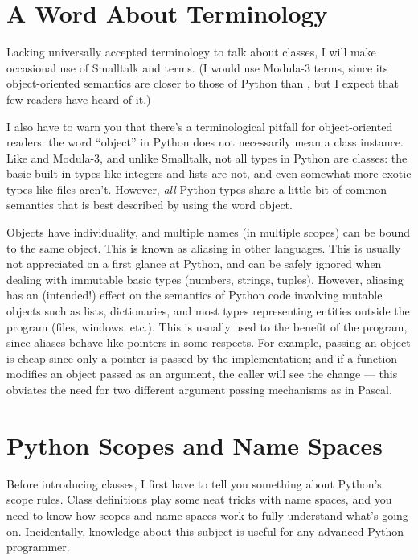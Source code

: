 \documentclass{manual}
\begin{document}
\section{A Word About Terminology \label{terminology}}

Lacking universally accepted terminology to talk about classes, I will
make occasional use of Smalltalk and \Cpp{} terms.  (I would use Modula-3
terms, since its object-oriented semantics are closer to those of
Python than \Cpp{}, but I expect that few readers have heard of it.)

I also have to warn you that there's a terminological pitfall for
object-oriented readers: the word ``object'' in Python does not
necessarily mean a class instance.  Like \Cpp{} and Modula-3, and
unlike Smalltalk, not all types in Python are classes: the basic
built-in types like integers and lists are not, and even somewhat more
exotic types like files aren't.  However, \emph{all} Python types
share a little bit of common semantics that is best described by using
the word object.

Objects have individuality, and multiple names (in multiple scopes)
can be bound to the same object.  This is known as aliasing in other
languages.  This is usually not appreciated on a first glance at
Python, and can be safely ignored when dealing with immutable basic
types (numbers, strings, tuples).  However, aliasing has an
(intended!) effect on the semantics of Python code involving mutable
objects such as lists, dictionaries, and most types representing
entities outside the program (files, windows, etc.).  This is usually
used to the benefit of the program, since aliases behave like pointers
in some respects.  For example, passing an object is cheap since only
a pointer is passed by the implementation; and if a function modifies
an object passed as an argument, the caller will see the change --- this
obviates the need for two different argument passing mechanisms as in
Pascal.


\section{Python Scopes and Name Spaces \label{scopes}}

Before introducing classes, I first have to tell you something about
Python's scope rules.  Class definitions play some neat tricks with
name spaces, and you need to know how scopes and name spaces work to
fully understand what's going on.  Incidentally, knowledge about this
subject is useful for any advanced Python programmer.
\end{document}
